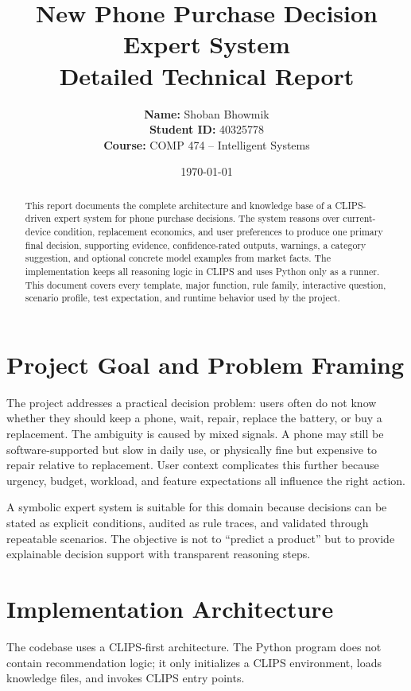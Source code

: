 \documentclass[11pt]{article}
\title{\textbf{New Phone Purchase Decision Expert System}\\\large Detailed Technical Report}
\author{\textbf{Name:} Shoban Bhowmik\\\textbf{Student ID:} 40325778\\\textbf{Course:} COMP 474 -- Intelligent Systems}
\date{\today}
\begin{document}
\maketitle
\thispagestyle{empty}

\begin{abstract}
This report documents the complete architecture and knowledge base of a CLIPS-driven expert system for phone purchase decisions. The system reasons over current-device condition, replacement economics, and user preferences to produce one primary final decision, supporting evidence, confidence-rated outputs, warnings, a category suggestion, and optional concrete model examples from market facts. The implementation keeps all reasoning logic in CLIPS and uses Python only as a runner. This document covers every template, major function, rule family, interactive question, scenario profile, test expectation, and runtime behavior used by the project.
\end{abstract}

\newpage
\tableofcontents
\newpage

\section{Project Goal and Problem Framing}
The project addresses a practical decision problem: users often do not know whether they should keep a phone, wait, repair, replace the battery, or buy a replacement. The ambiguity is caused by mixed signals. A phone may still be software-supported but slow in daily use, or physically fine but expensive to repair relative to replacement. User context complicates this further because urgency, budget, workload, and feature expectations all influence the right action.

A symbolic expert system is suitable for this domain because decisions can be stated as explicit conditions, audited as rule traces, and validated through repeatable scenarios. The objective is not to ``predict a product'' but to provide explainable decision support with transparent reasoning steps.

\section{Implementation Architecture}
The codebase uses a CLIPS-first architecture. The Python program does not contain recommendation logic; it only initializes a CLIPS environment, loads knowledge files, and invokes CLIPS entry points.
\end{document}
